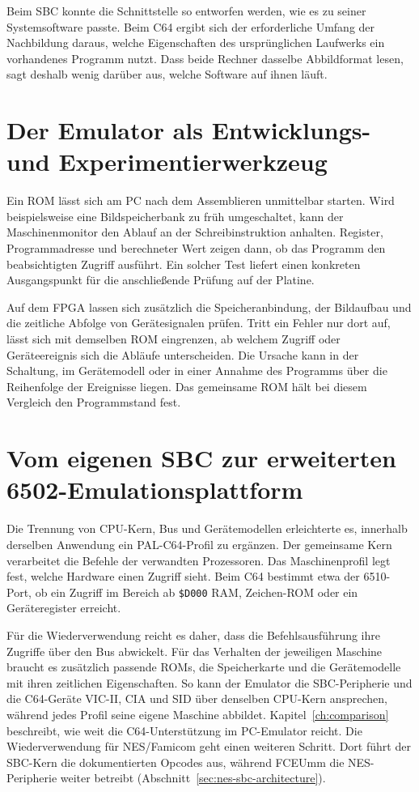 \documentclass[fontsize=10.2bp,DIV=calc,oneside,open=any,headings=normal,numbers=noenddot]{scrbook}
\begin{document}
Beim SBC konnte die Schnittstelle so entworfen werden, wie es zu seiner
Systemsoftware passte. Beim C64 ergibt sich der erforderliche Umfang
der Nachbildung daraus, welche Eigenschaften des ursprünglichen
Laufwerks ein vorhandenes Programm nutzt. Dass beide Rechner dasselbe
Abbildformat lesen, sagt deshalb wenig darüber aus, welche Software
auf ihnen läuft.

\clearpage
\section{Der Emulator als Entwicklungs- und Experimentierwerkzeug}

Ein ROM lässt sich am PC nach dem Assemblieren unmittelbar starten.
Wird beispielsweise eine Bildspeicherbank zu früh umgeschaltet, kann
der Maschinenmonitor den Ablauf an der Schreibinstruktion anhalten.
Register, Programmadresse und berechneter Wert zeigen dann, ob das
Programm den beabsichtigten Zugriff ausführt. Ein solcher Test liefert
einen konkreten Ausgangspunkt für die anschließende Prüfung auf
der Platine.

Auf dem FPGA lassen sich zusätzlich die Speicheranbindung, der
Bildaufbau und die zeitliche Abfolge von Gerätesignalen prüfen. Tritt
ein Fehler nur dort auf, lässt sich mit demselben ROM eingrenzen, ab
welchem Zugriff oder Geräteereignis sich die Abläufe unterscheiden.
Die Ursache kann in der Schaltung, im Gerätemodell oder in einer
Annahme des Programms über die Reihenfolge der Ereignisse liegen.
Das gemeinsame ROM hält bei diesem Vergleich den Programmstand fest.

\section{Vom eigenen SBC zur erweiterten 6502-Emulationsplattform}

Die Trennung von CPU-Kern, Bus und Gerätemodellen erleichterte es,
innerhalb derselben Anwendung ein PAL-C64-Profil zu ergänzen. Der
gemeinsame Kern verarbeitet die Befehle der verwandten Prozessoren.
Das Maschinenprofil legt fest, welche Hardware einen Zugriff sieht.
Beim C64 bestimmt etwa der 6510-Port, ob ein Zugriff im Bereich ab
\texttt{\$D000} RAM, Zeichen-ROM oder ein Geräteregister erreicht.

Für die Wiederverwendung reicht es daher, dass die Befehlsausführung
ihre Zugriffe über den Bus abwickelt. Für das Verhalten der jeweiligen
Maschine braucht es zusätzlich passende ROMs, die Speicherkarte und
die Gerätemodelle mit ihren zeitlichen Eigenschaften. So kann der
Emulator die SBC-Peripherie und die C64-Geräte VIC-II, CIA und SID
über denselben CPU-Kern ansprechen, während jedes Profil seine eigene
Maschine abbildet. Kapitel~\ref{ch:comparison} beschreibt, wie weit
die C64-Unterstützung im PC-Emulator reicht. Die Wiederverwendung für
NES/Famicom geht einen weiteren Schritt. Dort führt der SBC-Kern die
dokumentierten Opcodes aus, während FCEUmm die NES-Peripherie
weiter betreibt (Abschnitt~\ref{sec:nes-sbc-architecture}).
\end{document}
